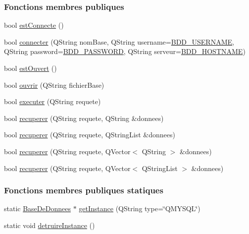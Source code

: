 \subsubsection*{Fonctions membres publiques}
\begin{DoxyCompactItemize}
\item 
bool \hyperlink{class_base_de_donnees_a00388973f3ec42e5c8e76e7af7e124b2}{est\+Connecte} ()
\item 
bool \hyperlink{class_base_de_donnees_ab2e092285ccc0ee1cce61a1774218561}{connecter} (Q\+String nom\+Base, Q\+String username=\hyperlink{basededonnees_8h_a88b5f5b81fa534553c68802384beff2c}{B\+D\+D\+\_\+\+U\+S\+E\+R\+N\+A\+ME}, Q\+String password=\hyperlink{basededonnees_8h_ae2ded9166ed2553182545e97514c04f7}{B\+D\+D\+\_\+\+P\+A\+S\+S\+W\+O\+RD}, Q\+String serveur=\hyperlink{basededonnees_8h_af06096ec4ec654090fa78ab359d4a0dd}{B\+D\+D\+\_\+\+H\+O\+S\+T\+N\+A\+ME})
\item 
bool \hyperlink{class_base_de_donnees_af9ac332082ffd0dd35e412cefabe5e9c}{est\+Ouvert} ()
\item 
bool \hyperlink{class_base_de_donnees_a7f6a5510b08017b0d99115a84252f186}{ouvrir} (Q\+String fichier\+Base)
\item 
bool \hyperlink{class_base_de_donnees_aa8de5f8f8bb17edc43f5c0ee33712081}{executer} (Q\+String requete)
\item 
bool \hyperlink{class_base_de_donnees_a77539baad389f5acf754cd2cd452403e}{recuperer} (Q\+String requete, Q\+String \&donnees)
\item 
bool \hyperlink{class_base_de_donnees_a2a5c461fa11d404810ae3ebe035d5190}{recuperer} (Q\+String requete, Q\+String\+List \&donnees)
\item 
bool \hyperlink{class_base_de_donnees_af9a76eb2b12df784280c379a4b22af62}{recuperer} (Q\+String requete, Q\+Vector$<$ Q\+String $>$ \&donnees)
\item 
bool \hyperlink{class_base_de_donnees_a68dd0d62ba03b9e8e5aa759d0666cb59}{recuperer} (Q\+String requete, Q\+Vector$<$ Q\+String\+List $>$ \&donnees)
\end{DoxyCompactItemize}
\subsubsection*{Fonctions membres publiques statiques}
\begin{DoxyCompactItemize}
\item 
static \hyperlink{class_base_de_donnees}{Base\+De\+Donnees} $\ast$ \hyperlink{class_base_de_donnees_a80028aa2b6b4fbf30fb2e36357b7d3d3}{get\+Instance} (Q\+String type=\char`\"{}Q\+M\+Y\+S\+QL\char`\"{})
\item 
static void \hyperlink{class_base_de_donnees_a457401c0816b888c77ce915997545f4e}{detruire\+Instance} ()
\end{DoxyCompactItemize}
